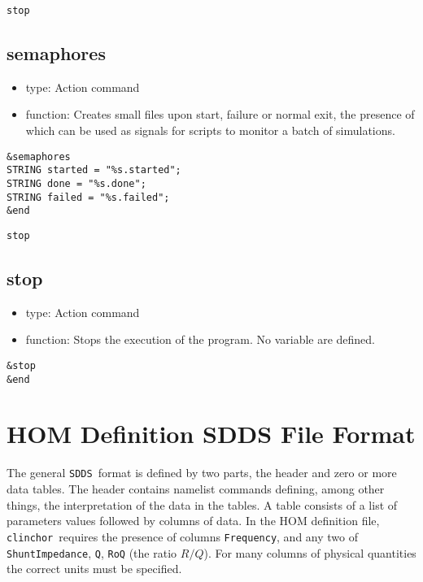 \documentclass[11pt]{article}
\newcommand{\clinchor}{{\tt clinchor}}
\newcommand{\SDDS}{{\tt SDDS}}
\begin{document}
\newpage
\begin{center}{\tt stop}\end{center}
\subsection{semaphores}

\begin{itemize}
\item type: Action command
\item function: Creates small files upon start, failure or normal exit, the presence of which can be used as signals for scripts to monitor a batch of simulations.
\end{itemize}
\begin{verbatim}
&semaphores
STRING started = "%s.started";
STRING done = "%s.done";
STRING failed = "%s.failed";
&end
\end{verbatim}



\newpage
\begin{center}{\tt stop}\end{center}
\subsection{stop}

\begin{itemize}
\item type: Action command
\item function: Stops the execution of the program. No variable are defined.
\end{itemize}
\begin{verbatim}
&stop
&end
\end{verbatim}

\section{HOM Definition SDDS File Format} \label{sect:HOM file definition}
The general \SDDS\ format is defined by two parts, the header and zero
or more data tables.  The header contains namelist commands defining,
among other things, the interpretation of the data in the tables. A
table consists of a list of parameters values followed by columns of
data. In the HOM definition file, \clinchor\ requires the presence of
columns {\tt Frequency}, and any two of {\tt ShuntImpedance}, {\tt Q},
{\tt RoQ} (the ratio $R/Q$). 
For many columns of physical quantities the correct units must be specified.
\end{document}
